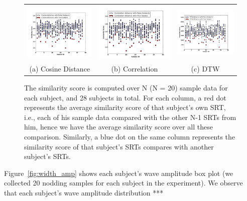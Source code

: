 \begin{figure}[t]
\begin{center}
\begin{tabular}{ccc}
\includegraphics [width=.33\linewidth]{figure/resp_time_cos.png}&
\includegraphics [width=.33\linewidth]{figure/resp_time_cor.png}&
\includegraphics [width=.33\linewidth]{figure/resp_time_dtw.png}\\
(a) Cosine Distance & (b) Correlation & (c) DTW \\
\end{tabular}
\end{center}
\caption{\label{fig:distance} The similarity score is computed over N (N = 20) sample data for each subject, and 28 subjects in total. For each column, a red dot represents the average similarity score of that subject's own SRT, i.e., each of his sample data compared with the other N-1 SRTs from him, hence we have the average similarity score over all these comparison. Similarly, a blue dot on the same column represents the similarity score of that subject's SRTs compares with another subject's SRTs.}
\vspace{-2pt}
\end{figure}


Figure~\ref{fig:width_amp} shows each subject's wave amplitude box plot (we collected 20 nodding samples for each subject in the experiment). We observe that each subject's wave amplitude distribution ***

